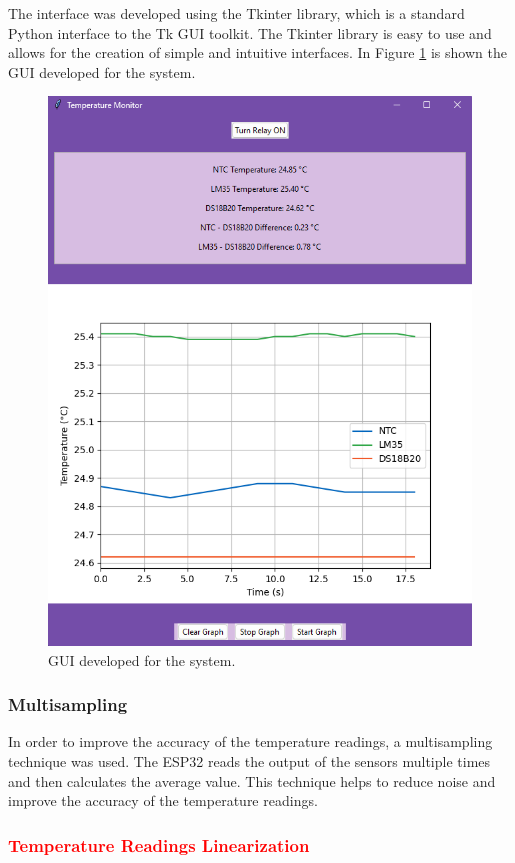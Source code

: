 \documentclass[12pt]{article}
\begin{document}
The interface was developed using the Tkinter library, which is a standard Python interface to the Tk GUI toolkit. The Tkinter library is easy to use and allows for the creation of simple and intuitive interfaces. In Figure \ref{fig:gui} is shown the GUI developed for the system.

\begin{figure}[H] 
    \centering
    \includegraphics*[scale = 0.4]{images/GUI-presentation.png}
    \caption{GUI developed for the system.}
    \label{fig:gui}
\end{figure}

\subsubsection{Multisampling}

In order to improve the accuracy of the temperature readings, a multisampling technique was used. The ESP32 reads the output of the sensors multiple times and then calculates the average value. This technique helps to reduce noise and improve the accuracy of the temperature readings.
\textcolor{red}{\subsubsection{Temperature Readings Linearization}}
\end{document}
